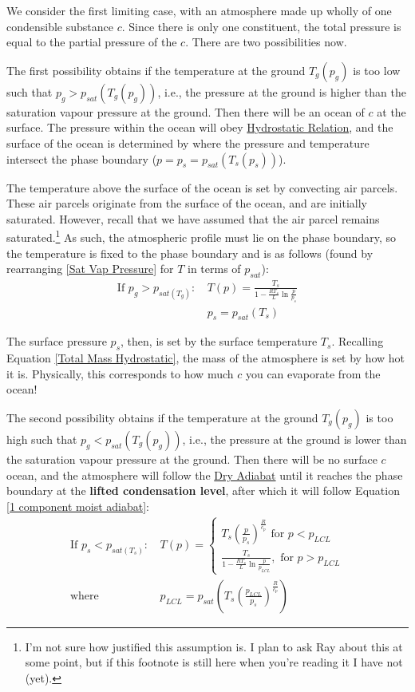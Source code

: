 We consider the first limiting case, with an atmosphere made up wholly of one condensible substance \(c\). Since there is only one constituent, the total pressure is equal to the partial pressure of the \(c\). There are two possibilities now.

The first possibility obtains if the temperature at the ground \(T_g(p_g)\) is too low such that \(p_g>p_{sat}(T_g(p_g))\), i.e., the pressure at the ground is higher than the saturation vapour pressure at the ground. Then there will be an ocean of \(c\) at the surface. The pressure within the ocean will obey \hyperref[Hydrostatic Balance]{Hydrostatic Relation}, and the surface of the ocean is determined by where the pressure and temperature intersect the phase boundary (\(p=p_s=p_{sat}(T_s(p_s))\)).

The temperature above the surface of the ocean is set by convecting air parcels. These air parcels originate from the surface of the ocean, and are initially saturated. However, recall that we have assumed that the air parcel remains saturated.\footnote{
    I'm not sure how justified this assumption is. I plan to ask Ray about this at some point, but if this footnote is still here when you're reading it I have not (yet).
} As such, the atmospheric profile must lie on the phase boundary, so the temperature is fixed to the phase boundary and is as follows (found by rearranging \ref{Sat Vap Pressure} for \(T\) in terms of \(p_{sat}\)):
\begin{align}
    \text{If } p_g>p_{sat(T_g)}\text{: }& T(p)=\frac{T_s}{1-\frac{RT_s}{L}\ln\frac{p}{p_{s}}} \label{1 component moist adiabat} \\
    &p_s = p_{sat}(T_s)
\end{align}

The surface pressure \(p_s\), then, is set by the surface temperature \(T_s\). Recalling Equation \ref{Total Mass Hydrostatic}, the mass of the atmosphere is set by how hot it is. Physically, this corresponds to how much \(c\) you can evaporate from the ocean!

The second possibility obtains if the temperature at the ground \(T_g(p_g)\) is too high such that \(p_g<p_{sat}(T_g(p_g))\), i.e., the pressure at the ground is lower than the saturation vapour pressure at the ground. Then there will be no surface \(c\) ocean, and the  atmosphere will follow the \hyperref[Dry Adiabat]{Dry Adiabat} until it reaches the phase boundary at the \textbf{lifted condensation level}, after which it will follow Equation \ref{1 component moist adiabat}:
\begin{align}
    \text{If } p_s<p_{sat(T_s)}\text{: }
    &
    T(p)=
    \begin{cases}
        T_s\left(\frac{p}{p_s}\right)^\frac{R}{c_p} \text{ for }p<p_{LCL}\\
        \frac{T_s}{1-\frac{RT_s}{L}\ln\frac{p}{p_{LCL}}}, \text{ for }p>p_{LCL}
    \end{cases}\\
    \text{where }&p_{LCL}=p_{sat}\left( T_s\left(\frac{p_{LCL}}{p_s}\right)^\frac{R}{c_p} \right)
\end{align}

